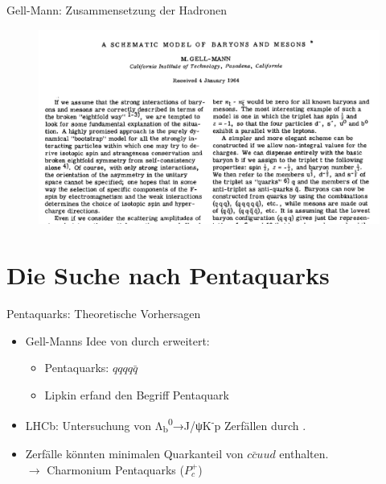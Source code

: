 \documentclass[aspectratio=169]{beamer} %
\begin{document}
              \begin{frame}{Gell-Mann: Zusammensetzung der Hadronen}
                \begin{figure}\includegraphics[height=0.85\textheight, width=\textwidth, keepaspectratio]{Images/8ad56d13-e301-4a37-be9c-7077ac16ce16.jpg}\\\small\cite[S.~214]{GellMann.1964}\end{figure}
    \end{frame}

    \section{Die Suche nach Pentaquarks}

    \begin{frame}{Pentaquarks: Theoretische Vorhersagen}
      \begin{itemize}
        \item Gell-Manns Idee von \citeyear{GellMann.1964} durch \textcite{Hogaasen.1978,Strottman.1979} erweitert:
        \begin{itemize}
          \item Pentaquarks: $qqqq\bar{q}$
          \item Lipkin erfand den Begriff Pentaquark \parencite{Lipkin.1987}
        \end{itemize}
        \item LHCb: Untersuchung von Λ\textsubscript{b}\textsuperscript{0}→J/ψK\textsuperscript{-}p Zerfällen durch \textcite{Aaij.2015}.
        \item Zerfälle könnten minimalen Quarkanteil von $c\bar{c}uud$ enthalten. \\ $\rightarrow$ Charmonium Pentaquarks ($P_c^+$)
      \end{itemize}
    \end{frame}
\end{document}
